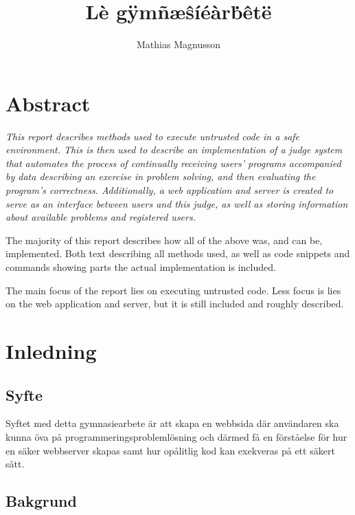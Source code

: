 \documentclass{article}
\author{Mathias Magnusson}
\title{Lè gÿmñæŝíéàrḃêtë}
\date{}
\begin{document}
\maketitle{}

\section*{Abstract}

\begin{par}

\itshape
This report describes methods used to execute untrusted code in a safe
environment. This is then used to describe an implementation of a judge system
that automates the process of continually receiving users' programs accompanied
by data describing an exercise in problem solving, and then evaluating the
program's correctness. Additionally, a web application and server is created to
serve as an interface between users and this judge, as well as storing
information about available problems and registered users.

The majority of this report describes how all of the above was, and can be,
implemented. Both text describing all methods used, as well as code snippets and
commands showing parts the actual implementation is included.

The main focus of the report lies on executing untrusted code. Less focus is
lies on the web application and server, but it is still included and roughly
described.

\end{par}

\clearpage

\tableofcontents

\clearpage

\section{Inledning}

\subsection{Syfte}

Syftet med detta gymnasiearbete är att skapa en webbsida där användaren ska
kunna öva på programmeringsproblemlösning och därmed få en förståelse för hur
en säker webbserver skapas samt hur opålitlig kod kan exekveras på ett säkert
sätt.

\subsection{Bakgrund}
\end{document}
